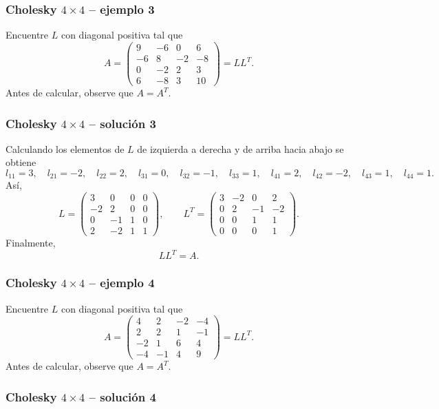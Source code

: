 \subsubsection*{Cholesky $4\times 4$ -- ejemplo 3}

Encuentre $L$ con diagonal positiva tal que
\[
A=\begin{pmatrix}9 & -6 & 0 & 6\\-6 & 8 & -2 & -8\\0 & -2 & 2 & 3\\6 & -8 & 3 & 10\end{pmatrix}=LL^T.
\]
Antes de calcular, observe que $A=A^T$.


\subsubsection*{Cholesky $4\times 4$ -- solución 3}

Calculando los elementos de $L$ de izquierda a derecha y de arriba hacia abajo se obtiene
\[
l_{11}=3,\quad l_{21}=-2,\quad l_{22}=2,\quad l_{31}=0,\quad l_{32}=-1,\quad l_{33}=1,\quad l_{41}=2,\quad l_{42}=-2,\quad l_{43}=1,\quad l_{44}=1.
\]
Así,
\[
L=\begin{pmatrix}3 & 0 & 0 & 0\\-2 & 2 & 0 & 0\\0 & -1 & 1 & 0\\2 & -2 & 1 & 1\end{pmatrix},\qquad L^T=\begin{pmatrix}3 & -2 & 0 & 2\\0 & 2 & -1 & -2\\0 & 0 & 1 & 1\\0 & 0 & 0 & 1\end{pmatrix}.
\]
Finalmente,
\[
\boxed{LL^T=A}.
\]


\subsubsection*{Cholesky $4\times 4$ -- ejemplo 4}

Encuentre $L$ con diagonal positiva tal que
\[
A=\begin{pmatrix}4 & 2 & -2 & -4\\2 & 2 & 1 & -1\\-2 & 1 & 6 & 4\\-4 & -1 & 4 & 9\end{pmatrix}=LL^T.
\]
Antes de calcular, observe que $A=A^T$.


\subsubsection*{Cholesky $4\times 4$ -- solución 4}

